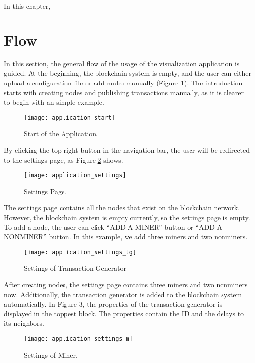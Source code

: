 In this chapter, 

\section{Flow}

In this section, the general flow of the usage of the visualization application is guided. At the beginning, the blockchain system is empty, and the user can either upload a configuration file or add nodes manually (Figure \ref{fig:start of the application}). The introduction starts with creating nodes and publishing transactions manually, as it is clearer to begin with an simple example.

\begin{figure}[htb]
    \centering
    \texttt{[image: application\_start]}
    \caption{Start of the Application.}
    \label{fig:start of the application}
\end{figure}

By clicking the top right button in the navigation bar, the user will be redirected to the settings page, as Figure \ref{fig:settings page} shows.

\begin{figure}[htb]
    \centering
    \texttt{[image: application\_settings]}
    \caption{Settings Page.}
    \label{fig:settings page}
\end{figure}

The settings page contains all the nodes that exist on the blockchain network. However, the blockchain system is empty currently, so the settings page is empty. To add a node, the user can click ``ADD A MINER'' button or ``ADD A NONMINER'' button. In this example, we add three miners and two nonminers.

\begin{figure}[htb]
    \centering
    \texttt{[image: application\_settings\_tg]}
    \caption{Settings of Transaction Generator.}
    \label{fig:settings of transaction generator}
\end{figure}

After creating nodes, the settings page contains three miners and two nonminers now. Additionally, the transaction generator is added to the blockchain system automatically. In Figure \ref{fig:settings of transaction generator}, the properties of the transaction generator is displayed in the toppest block. The properties contain the ID and the delays to its neighbors.

\begin{figure}[htb]
    \centering
    \texttt{[image: application\_settings\_m]}
    \caption{Settings of Miner.}
    \label{fig:settings of miner}
\end{figure}

